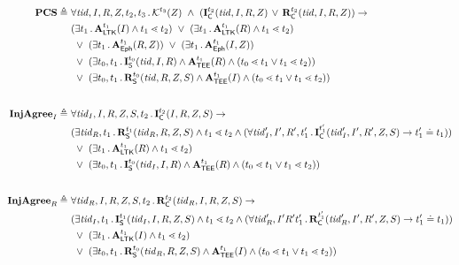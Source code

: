 \begin{figure*}[ht]
\begin{align*}
    \mPredPcs \triangleq\ & \forall \mTID, I, R, \mSessKey, t_2, t_3\mLogicDot
    \mK^{t_3}(\mSessKey)\  \land\ 
    (\mIComplete^{t_2}(\mTID, I, R, \mSessKey)\, \lor\, \mRComplete^{t_2}(\mTID, I, R, 
\mSessKey))
    \rightarrow\\
    &(\exists t_1\mLogicDot \mRevLTK^{t_1}(I) \land t_1 \lessdot t_2)
    \ \lor\ (\exists t_1\mLogicDot \mRevLTK^{t_1}(R) \land t_1 \lessdot t_2)\\
    &\ \lor\ (\exists t_1\mLogicDot \mRevEph^{t_1}(R, \mSessKey))
    \ \lor\ (\exists t_1\mLogicDot \mRevEph^{t_1}(I, \mSessKey))\\
    &\ \lor\ (\exists t_0, t_1\mLogicDot \mIStart^{t_0}(\mTID, I, R) \land \mTEE^{t_1}(R) \land (t_0 \lessdot t_1 \lor t_1 \lessdot t_2))\\
    &\ \lor\ (\exists t_0, t_1\mLogicDot \mRStart^{t_0}(\mTID, R, \mSessKey, S) \land \mTEE^{t_1}(I) \land (t_0 \lessdot t_1 \lor t_1 \lessdot t_2))\\[2em]
%
    \mPredInjI \triangleq\ &
    \forall \mTID_I, I, R, \mSessKey, S, t_2\mLogicDot \mIComplete^{t_2}(I, R, 
\mSessKey, S)
    \rightarrow\\
    &(\exists \mTID_R, t_1\mLogicDot \mRStart^{t_1}(\mTID_R, R, \mSessKey, S) \land t_1 \lessdot t_2
    \land (\forall \mTID_I', I', R', t_1' \mLogicDot \mIComplete^{t_1'}(\mTID_I', I' , R', \mSessKey, S)
        \rightarrow t_1' \doteq t_1))\\
    &\ \lor\ (\exists t_1\mLogicDot \mRevLTK^{t_1}(R) \land t_1 \lessdot t_2)\\
    &\ \lor\ (\exists t_0, t_1\mLogicDot \mIStart^{t_0}(\mTID_I, I, R) \land \mTEE^{t_1}(R) \land (t_0 \lessdot t_1 \lor t_1 \lessdot t_2))\\[2em]
%
    \mPredInjR \triangleq\ &
    \forall \mTID_R, I, R, \mSessKey, S, t_2\mLogicDot \mRComplete^{t_2}(\mTID_R, I, R, 
\mSessKey, S)
    \rightarrow\\
    &(\exists \mTID_I, t_1\mLogicDot \mIStart^{t_1}(\mTID_I, I, R, \mSessKey, S) \land t_1 \lessdot t_2
    \land (\forall \mTID_R', I' R' t_1' \mLogicDot \mRComplete^{t_1'}(\mTID_R', I' , R', \mSessKey, S)
        \rightarrow t_1' \doteq t_1))\\
    &\ \lor\ (\exists t_1\mLogicDot \mRevLTK^{t_1}(I) \land t_1 \lessdot t_2)\\
    &\ \lor\ (\exists t_0, t_1\mLogicDot \mRStart^{t_0}(\mTID_R, R, \mSessKey, S) \land \mTEE^{t_1}(I) \land (t_0 \lessdot t_1 \lor t_1 \lessdot t_2))\\[2em]

\end{align*}
\end{figure*}
